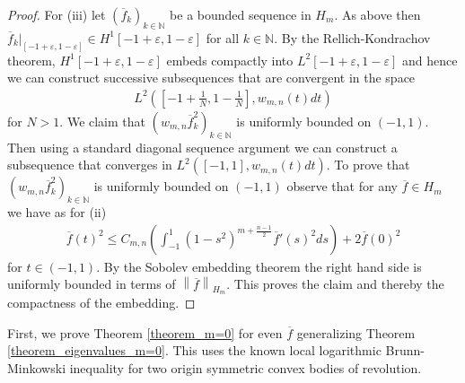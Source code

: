 \documentclass[12pt,twoside]{amsart}
\numberwithin{satz}{section}
\theoremstyle{definition}
\numberwithin{equation}{section}
\newcommand\N{\mathbb{N}}
\newcommand{\norm}[1]{\left\lVert#1\right\rVert}
\begin{document}
\begin{proof}
		For (iii) let $(\overline{f}_k)_{k\in\N}$ be a bounded sequence in $H_m$. As above then $\overline{f}_k|_{[-1+\varepsilon,1-\varepsilon]}\in H^1[-1+\varepsilon,1-\varepsilon]$ for all $k\in\N$. By the Rellich-Kondrachov theorem, $H^1[-1+\varepsilon,1-\varepsilon]$ embeds compactly into $L^2[-1+\varepsilon,1-\varepsilon]$ and hence we can construct successive subsequences that are convergent in the space
		\begin{align*}
			L^2\left(\left[-1+\frac{1}{N},1-\frac{1}{N}\right],w_{m,n}(t)dt\right)
		\end{align*}
		for $N>1$. We claim that $(w_{m,n}\overline{f}_k^2)_{k\in\N}$ is uniformly bounded on $(-1,1)$. Then using a standard diagonal sequence argument we can construct a subsequence that converges in $L^2([-1,1],w_{m,n}(t)dt)$. To prove that $(w_{m,n}\overline{f}_k^2)_{k\in\N}$ is uniformly bounded on $(-1,1)$ observe that for any $\overline{f}\in H_m$ we have as for (ii)
		\begin{align*}
			\overline{f}(t)^2\leq C_{m,n} \left(\int_{-1}^1 (1-s^2)^{m+\frac{n-1}{2}}\overline{f}'(s)^2ds\right)+2\overline{f}(0)^2
		\end{align*}
		for $t\in(-1,1)$. By the Sobolev embedding theorem the right hand side is uniformly bounded in terms of $\norm{\overline{f}}_{H_m}$. This proves the claim and thereby the compactness of the embedding. 
	\end{proof}
	
	First, we prove Theorem \ref{theorem_m=0} for even $\overline{f}$ generalizing Theorem \ref{theorem_eigenvalues_m=0}. This uses the known local logarithmic Brunn-Minkowski inequality for two origin symmetric convex bodies of revolution.
	
\end{document}
